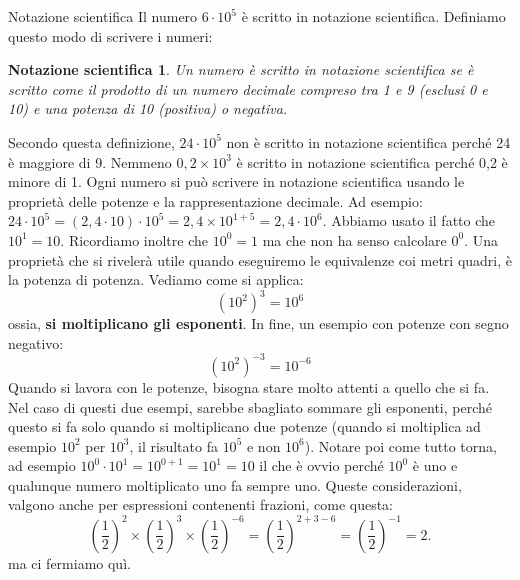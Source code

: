 \documentclass[12pt,a4paper,oneside]{book}
\makeatletter
\newtheorem{nsc}{Notazione scientifica}
\renewcommand{\subsection}{\@startsection {subsection}{2}{\z@}
{-3ex \@plus -0.1ex \@minus -.4ex}
{0.5ex \@plus.2ex }
{\color[rgb]{0.141,0.596,0.749}\normalfont\sffamily\bfseries}}
\theoremstyle{esercizio}
\makeatother
\begin{document}
\subsection{Notazione scientifica}
Il numero $6 \cdot 10^5$ è scritto in notazione scientifica. Definiamo questo modo di scrivere i numeri:
\begin{nsc}
	Un numero è scritto in notazione scientifica se è scritto come il prodotto di un numero decimale compreso tra 1 e 9 (esclusi 0 e 10) e una potenza di 10 (positiva) o negativa.
\end{nsc}
Secondo questa definizione, $24 \cdot 10^5$ non è scritto in notazione scientifica perché 24 è maggiore di 9. Nemmeno $0,2\times10^3$ è scritto in notazione scientifica perché 0,2 è minore di 1. Ogni numero si può scrivere in notazione scientifica usando le proprietà delle potenze e la rappresentazione decimale. Ad esempio: $24 \cdot 10^5 = (2,4\cdot10)\cdot10^5 = 2,4\times 10^{1+5}=2,4\cdot 10^6$. Abbiamo usato il fatto che $10^1 = 10$. Ricordiamo inoltre che $10^0 = 1$  ma che non ha senso calcolare $0^0$. Una proprietà che si rivelerà utile quando eseguiremo le equivalenze coi metri quadri, è la potenza di potenza. Vediamo come si applica:
\[
\left(10^2\right)^3 = 10^6
\]
ossia,  \textbf{si moltiplicano gli esponenti}. In fine, un esempio con potenze con segno negativo:
\[
\left(10^2\right)^{-3} = 10^{-6}
\]
Quando si lavora con le potenze, bisogna stare molto attenti a quello che si fa. Nel caso di questi due esempi, sarebbe sbagliato sommare gli esponenti, perché questo si fa solo quando si moltiplicano due potenze (quando si moltiplica ad esempio $10^2$ per $10^3$,  il risultato fa $10^5$ e non $10^6$). Notare poi come tutto torna, ad esempio $10^0\cdot 10^1 = 10^{0+1} =10^1 = 10$ il che è ovvio perché $10^0$ è uno e qualunque numero moltiplicato uno fa sempre uno. Queste considerazioni, valgono anche per espressioni contenenti frazioni, come questa:
\[
\left(\frac{1}{2}\right)^2\times \left(\frac{1}{2}\right)^3 \times\left(\frac{1}{2}\right)^{-6}= \left(\frac{1}{2}\right)^{2+3-6} = \left(\frac{1}{2}\right)^{-1} =2.
\]
ma ci fermiamo quì.
\end{document}
